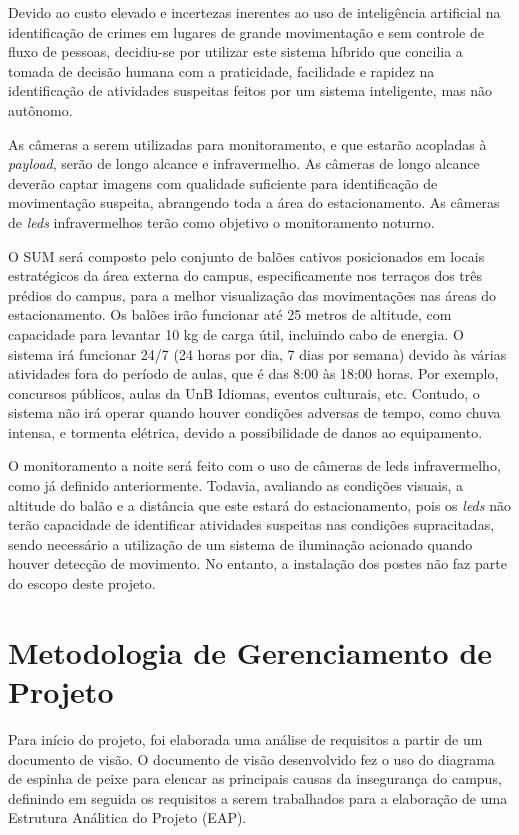   Devido ao custo elevado e incertezas inerentes ao uso de inteligência artificial na identificação de crimes em lugares de grande movimentação e sem controle de fluxo de pessoas, decidiu-se por utilizar este sistema híbrido que concilia a tomada de decisão humana com a praticidade, facilidade e rapidez na identificação de atividades suspeitas feitos por um sistema inteligente, mas não autônomo.

  As câmeras a serem utilizadas para monitoramento, e que estarão acopladas à \emph{payload}, serão de longo alcance e infravermelho.  As câmeras de longo alcance deverão captar imagens com qualidade suficiente para identificação de movimentação suspeita, abrangendo toda a área do estacionamento. As câmeras de \emph{leds} infravermelhos terão como objetivo o monitoramento noturno.

  O SUM será composto pelo conjunto de balões cativos posicionados em locais estratégicos da área externa do campus, especificamente nos terraços dos três prédios do campus, para a melhor visualização das movimentações nas áreas do estacionamento. Os balões irão funcionar até 25 metros de altitude, com capacidade para levantar 10 kg de carga útil, incluindo cabo de energia. O sistema irá funcionar 24/7 (24 horas por dia, 7 dias por semana) devido às várias atividades fora do período de aulas, que é das 8:00 às 18:00 horas. Por exemplo, concursos públicos, aulas da UnB Idiomas, eventos culturais, etc. Contudo, o sistema não irá operar quando houver condições adversas de tempo, como chuva intensa, e tormenta elétrica, devido a possibilidade de danos ao equipamento.

  O monitoramento a noite será feito com o uso de câmeras de leds infravermelho, como já definido anteriormente. Todavia, avaliando as condições visuais, a altitude do balão e a distância que este estará do estacionamento, pois os \emph{leds} não terão capacidade  de identificar atividades suspeitas nas condições supracitadas, sendo necessário a utilização de um sistema de iluminação acionado quando houver detecção de movimento. No entanto, a instalação dos postes não faz parte do escopo deste projeto.

\section{Metodologia de Gerenciamento de Projeto} %

  Para início do projeto, foi elaborada uma análise de requisitos a partir de um documento de visão. O documento de visão desenvolvido fez o uso do diagrama de espinha de peixe para elencar as principais causas da insegurança do campus, definindo em seguida os requisitos a serem trabalhados para a elaboração de uma Estrutura Análitica do Projeto (EAP).

